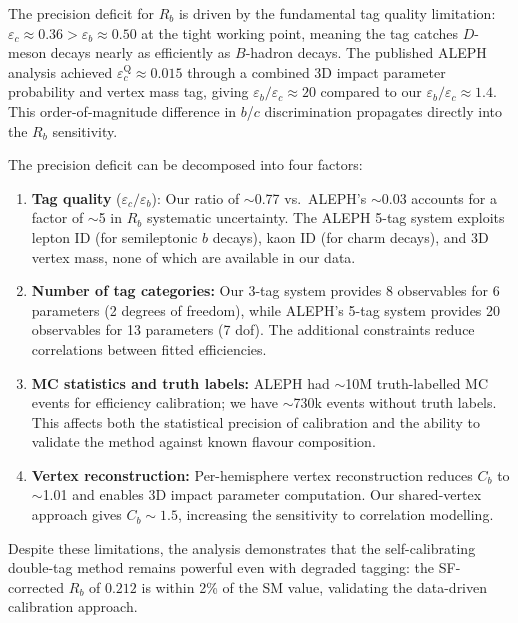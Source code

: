\documentclass[11pt,a4paper]{article}
\begin{document}
The precision deficit for $R_b$ is driven by the fundamental
tag quality limitation: $\varepsilon_c \approx 0.36 >
\varepsilon_b \approx 0.50$ at the tight working point, meaning
the tag catches $D$-meson decays nearly as efficiently as
$B$-hadron decays.
The published ALEPH analysis achieved $\varepsilon_c^\text{Q} \approx
0.015$ through a combined 3D impact parameter probability
and vertex mass tag, giving $\varepsilon_b/\varepsilon_c
\approx 20$ compared to our $\varepsilon_b/\varepsilon_c \approx
1.4$.
This order-of-magnitude difference in $b$/$c$ discrimination
propagates directly into the $R_b$ sensitivity.

The precision deficit can be decomposed into four factors:
\begin{enumerate}
\item \textbf{Tag quality} ($\varepsilon_c/\varepsilon_b$):
  Our ratio of $\sim$0.77 vs.\ ALEPH's $\sim$0.03 accounts for
  a factor of $\sim$5 in $R_b$ systematic uncertainty.
  The ALEPH 5-tag system exploits lepton ID (for semileptonic
  $b$ decays), kaon ID (for charm decays), and 3D vertex mass,
  none of which are available in our data.

\item \textbf{Number of tag categories:}
  Our 3-tag system provides 8 observables for 6 parameters (2
  degrees of freedom), while ALEPH's 5-tag system provides 20
  observables for 13 parameters (7 dof).
  The additional constraints reduce correlations between
  fitted efficiencies.

\item \textbf{MC statistics and truth labels:}
  ALEPH had $\sim$10M truth-labelled MC events for efficiency
  calibration; we have $\sim$730k events without truth labels.
  This affects both the statistical precision of calibration and
  the ability to validate the method against known flavour
  composition.

\item \textbf{Vertex reconstruction:}
  Per-hemisphere vertex reconstruction reduces $C_b$ to $\sim$1.01
  and enables 3D impact parameter computation.
  Our shared-vertex approach gives $C_b \sim 1.5$, increasing the
  sensitivity to correlation modelling.
\end{enumerate}

Despite these limitations, the analysis demonstrates that the
self-calibrating double-tag method remains powerful even with
degraded tagging: the SF-corrected $R_b$ of $0.212$ is within
2\% of the SM value, validating the data-driven calibration
approach.
\end{document}
